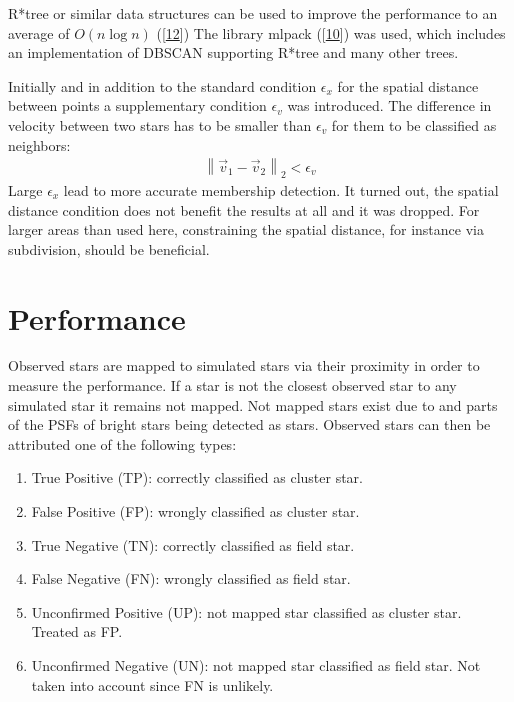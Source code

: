 \documentclass[letterpaper,10pt,english]{sphinxmanual}
\begin{document}
\sphinxAtStartPar
R*\sphinxhyphen{}tree or similar data structures can be used to improve the performance to an average of \(O(n\log{n})\) ({[}\hyperlink{cite.NBodySimulation/Appendix:id33}{12}{]})
The library mlpack ({[}\hyperlink{cite.NBodySimulation/Appendix:id34}{10}{]}) was used, which includes an implementation of DBSCAN supporting R*\sphinxhyphen{}tree and many other trees.

\sphinxAtStartPar
Initially and in addition to the standard condition \(\epsilon_{x}\) for the spatial distance between points a supplementary condition \(\epsilon_{v}\) was introduced.
The difference in velocity between two stars has to be smaller than \(\epsilon_{v}\) for them to be classified as neighbors:
\begin{equation*}
\begin{split}\left \|\vec{v}_{1}-\vec{v}_{2}  \right \|_{2}< \epsilon_{v}\end{split}
\end{equation*}
\sphinxAtStartPar
Large \(\epsilon_{x}\) lead to more accurate membership detection. It turned out, the spatial distance condition does not benefit the results at all and it was dropped.
For larger areas than used here, constraining the spatial distance, for instance via subdivision, should be beneficial.


\section{Performance}
\label{\detokenize{NBodySimulation/Clustering:performance}}
\sphinxAtStartPar
Observed stars are mapped to simulated stars via their proximity in order to measure the performance. If a star is not the closest observed star to any simulated star it remains not mapped.
Not mapped stars exist due to {\hyperref[\detokenize{NBodySimulation/DataReduction:background-label}]{}} and parts of the PSFs of bright stars being detected as stars. Observed stars can then be attributed one of the following types:
\begin{enumerate}
%
\item {} 
\sphinxAtStartPar
True Positive (TP): correctly classified as cluster star.

\item {} 
\sphinxAtStartPar
False Positive (FP): wrongly classified as cluster star.

\item {} 
\sphinxAtStartPar
True Negative (TN): correctly classified as field star.

\item {} 
\sphinxAtStartPar
False Negative (FN): wrongly classified as field star.

\item {} 
\sphinxAtStartPar
Unconfirmed Positive (UP): not mapped star classified as cluster star. Treated as FP.

\item {} 
\sphinxAtStartPar
Unconfirmed Negative (UN): not mapped star classified as field star. Not taken into account since FN is unlikely.

\end{enumerate}
\end{document}
